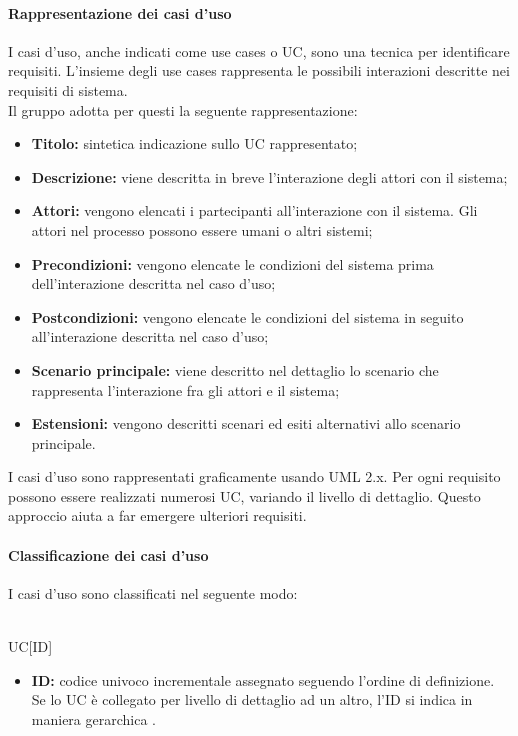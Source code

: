 \paragraph{Rappresentazione dei casi d'uso}\label{RappresentazioneUC}
I casi d'uso, anche indicati come use cases o UC, sono una tecnica per identificare requisiti. L'insieme degli use cases rappresenta le possibili interazioni descritte nei requisiti di sistema.\\
Il gruppo \groupName{} adotta per questi la seguente rappresentazione:
\begin{itemize}
	\item \textbf{Titolo:} sintetica indicazione sullo UC rappresentato; 
	\item \textbf{Descrizione:} viene descritta in breve l'interazione  degli attori con il sistema;
	\item \textbf{Attori:} vengono elencati i partecipanti all'interazione con il sistema. Gli attori nel processo possono essere umani o altri sistemi;
	\item \textbf{Precondizioni:} vengono elencate le condizioni del sistema prima dell'interazione descritta nel caso d'uso;
	\item \textbf{Postcondizioni:} vengono elencate le condizioni del sistema in seguito all'interazione descritta nel caso d'uso;
	\item \textbf{Scenario principale:} viene descritto nel dettaglio lo scenario che rappresenta l'interazione fra gli attori e il sistema;
	\item \textbf{Estensioni:} vengono descritti scenari ed esiti alternativi allo scenario principale.
\end{itemize}
I casi d'uso sono rappresentati graficamente usando UML 2.x. Per ogni requisito possono essere realizzati numerosi UC, variando il livello di dettaglio. Questo approccio aiuta a far emergere ulteriori requisiti.

\paragraph{Classificazione dei casi d'uso}
I casi d'uso sono classificati nel seguente modo:\\\\
{\centering UC[ID]
	
}
\begin{itemize}
	\item \textbf{ID:} codice univoco incrementale assegnato seguendo l'ordine di definizione. Se lo UC è collegato per livello di dettaglio ad un altro, l'ID si indica in maniera gerarchica .
\end{itemize}

